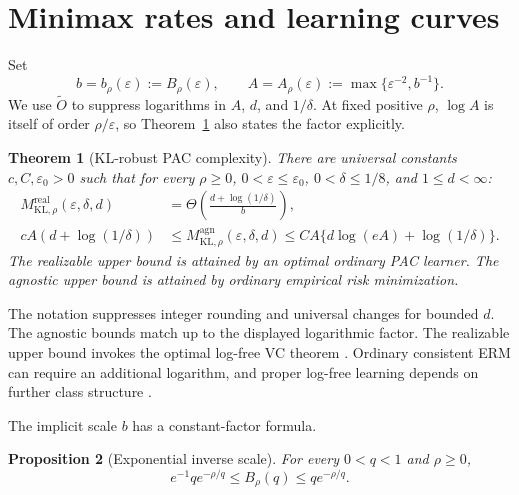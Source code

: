 \documentclass{article}
\newtheorem{theorem}{Theorem}
\newtheorem{proposition}[theorem]{Proposition}
\theoremstyle{remark}
\newcommand{\eps}{\varepsilon}
\begin{document}
\section{Minimax rates and learning curves}
\label{sec:rates}

Set
\begin{equation}
 b=b_\rho(\eps):=B_\rho(\eps),\qquad
 A=A_\rho(\eps):=\max\{\eps^{-2},b^{-1}\}.
 \label{eq:bA}
\end{equation}
We use $\widetilde O$ to suppress logarithms in $A$, $d$, and $1/\delta$.  At fixed positive $\rho$, $\log A$ is itself of order $\rho/\eps$, so Theorem~\ref{thm:main} also states the factor explicitly.

\begin{theorem}[KL-robust PAC complexity]
\label{thm:main}
There are universal constants $c,C,\eps_0>0$ such that for every $\rho\ge0$, $0<\eps\le\eps_0$, $0<\delta\le1/8$, and $1\le d<\infty$:
\begin{align}
 M^{\mathrm{real}}_{\mathrm{KL},\rho}(\eps,\delta,d)
 &=\Theta\!\left(\frac{d+\log(1/\delta)}{b}\right),
 \label{eq:real-rate}\\
 cA(d+\log(1/\delta))
 &\le M^{\mathrm{agn}}_{\mathrm{KL},\rho}(\eps,\delta,d)
 \le CA\{d\log(eA)+\log(1/\delta)\}.
 \label{eq:agn-rate}
\end{align}
The realizable upper bound is attained by an optimal ordinary PAC learner. The agnostic upper bound is attained by ordinary empirical risk minimization.
\end{theorem}

The notation suppresses integer rounding and universal changes for bounded $d$.  The agnostic bounds match up to the displayed logarithmic factor.  The realizable upper bound invokes the optimal log-free VC theorem \citep{hanneke2016optimal}.  Ordinary consistent ERM can require an additional logarithm, and proper log-free learning depends on further class structure \citep{bousquet2020proper}.

The implicit scale $b$ has a constant-factor formula.

\begin{proposition}[Exponential inverse scale]
\label{prop:inverse}
For every $0<q<1$ and $\rho\ge0$,
\begin{equation}
 e^{-1}q e^{-\rho/q}\le B_\rho(q)\le q e^{-\rho/q}.
 \label{eq:inverse-bound}
\end{equation}
\end{proposition}
\end{document}

